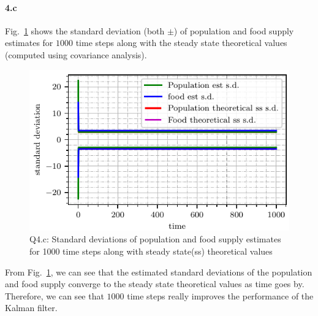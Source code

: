 \paragraph{4.c}Fig.~\ref{fig:q4_std_dev_theoretical_1000} shows the standard deviation (both $\pm$) of population and food supply estimates for $1000$ time steps along with the steady state theoretical values (computed using covariance analysis).
\begin{figure}[!h]
	\centering
	\includegraphics[scale=1.0,trim={0cm 0cm 0cm 0cm},clip]{./code/generatedPlots/q4_std_dev_theoretical_1000.pdf}
	\caption{Q4.c: Standard deviations of population and food supply estimates for 1000 time steps along with steady state(ss) theoretical values}
	\label{fig:q4_std_dev_theoretical_1000}
\end{figure}
From Fig.~\ref{fig:q4_std_dev_theoretical_1000}, we can see that the estimated standard deviations of the population and food supply converge to the steady state theoretical values as time goes by. Therefore, we can see that $1000$ time steps really improves the performance of the Kalman filter.
